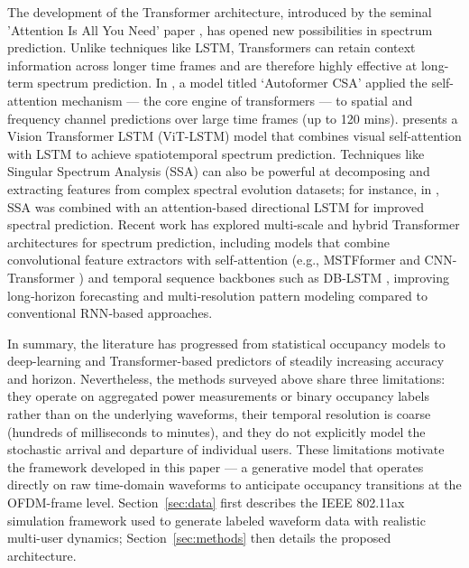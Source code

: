 \documentclass[lettersize,journal]{IEEEtran}
\begin{document}
The development of the Transformer architecture, introduced by the seminal 'Attention Is All You Need' paper \cite{Vaswani_2017}, has opened new possibilities in spectrum prediction. Unlike techniques like LSTM, Transformers can retain context information across longer time frames and are therefore highly effective at long-term spectrum prediction. In \cite{Pan_2023}, a model titled ‘Autoformer CSA’ applied the self-attention mechanism — the core engine of transformers — to spatial and frequency channel predictions over large time frames (up to 120 mins). \cite{Pan_2026} presents a Vision Transformer LSTM (ViT-LSTM) model that combines visual self-attention with LSTM to achieve spatiotemporal spectrum prediction. Techniques like Singular Spectrum Analysis (SSA) can also be powerful at decomposing and extracting features from complex spectral evolution datasets; for instance, in \cite{Ben_2025}, SSA was combined with an attention-based directional LSTM for improved spectral prediction. Recent work has explored multi‑scale and hybrid Transformer architectures for spectrum prediction, including models that combine convolutional feature extractors with self‑attention (e.g., MSTFformer \cite{Shuang_Li_2025} and CNN-Transformer \cite{Guan_2025}) and temporal sequence backbones such as DB-LSTM \cite{Xu_2024}, improving long‑horizon forecasting and multi‑resolution pattern modeling compared to conventional RNN‑based approaches.

In summary, the literature has progressed from statistical occupancy models to deep-learning and Transformer-based predictors of steadily increasing accuracy and horizon. Nevertheless, the methods surveyed above share three limitations: they operate on aggregated power measurements or binary occupancy labels rather than on the underlying waveforms, their temporal resolution is coarse (hundreds of milliseconds to minutes), and they do not explicitly model the stochastic arrival and departure of individual users. These limitations motivate the framework developed in this paper — a generative model that operates directly on raw time-domain waveforms to anticipate occupancy transitions at the OFDM-frame level. Section~\ref{sec:data} first describes the IEEE 802.11ax simulation framework used to generate labeled waveform data with realistic multi-user dynamics; Section~\ref{sec:methods} then details the proposed architecture.
\end{document}

